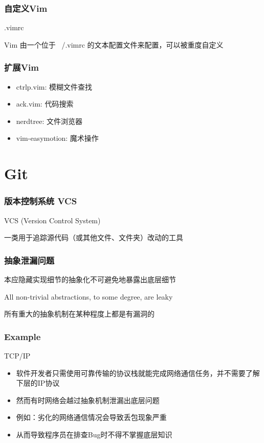 \documentclass[UTF8, 16pt]{beamer}
\begin{document}
\begin{frame}
    \frametitle{自定义Vim}
    \textcolor{sufered}{.vimrc}

    Vim 由一个位于 ~/.vimrc 的文本配置文件来配置，可以被重度自定义
\end{frame}

\begin{frame}
    \frametitle{扩展Vim}
    \begin{itemize}
        \item ctrlp.vim: 模糊文件查找
        \item ack.vim: 代码搜索
        \item nerdtree: 文件浏览器
        \item vim-easymotion: 魔术操作
    \end{itemize}
\end{frame}

\section{Git}

\begin{frame}
    \frametitle{版本控制系统 VCS}
    \textcolor{sufered}{VCS (Version Control System)}

    一类用于追踪源代码（或其他文件、文件夹）改动的工具
\end{frame}

\begin{frame}
    \frametitle{抽象泄漏问题}
    \textcolor{sufered}{本应隐藏实现细节的抽象化不可避免地暴露出底层细节}

    All non-trivial abstractions, to some degree, are leaky

    所有重大的抽象机制在某种程度上都是有漏洞的
\end{frame}

\begin{frame}
    \frametitle{Example}
    \textcolor{sufered}{TCP/IP}
    \begin{itemize}
        \item 软件开发者只需使用可靠传输的协议栈就能完成网络通信任务，并不需要了解下层的IP协议
        \item 然而有时网络会越过抽象机制泄漏出底层问题
        \item 例如：劣化的网络通信情况会导致丢包现象严重
        \item 从而导致程序员在排查Bug时不得不掌握底层知识
    \end{itemize}
\end{frame}
\end{document}
